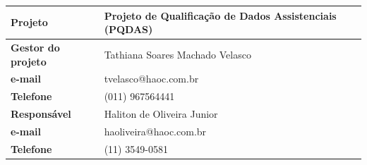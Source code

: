 \documentclass[
	12pt,				%
	openright,			%
	twoside,			%
	a4paper,			%
	english,			%
	french,				%
	spanish,			%
	brazil,				%
	]{abntex2}
\begin{document}

\frenchspacing 



\begin{historicorevisao}
\begin{table}[!h]
\centering
\begin{tabular}{|p{4cm}p{4cm}p{4cm}p{4cm}|}
\hline
\multicolumn{1}{|p{4cm}|}{\textbf{Projeto}}       & \multicolumn{3}{p{12cm}|}{Projeto de Qualificação de Dados Assistenciais (PQDAS)} \\ \hline
\multicolumn{1}{|p{4cm}|}{\textbf{Gestor do projeto}}       & \multicolumn{3}{p{12cm}|}{Tathiana Soares Machado Velasco} \\ \hline
\multicolumn{1}{|p{4cm}|}{\textbf{e-mail}}       & \multicolumn{3}{p{12cm}|}{tvelasco@haoc.com.br} \\ \hline
\multicolumn{1}{|p{4cm}|}{\textbf{Telefone}}       & \multicolumn{3}{p{12cm}|}{(011) 967564441} \\ \hline
\multicolumn{1}{|p{4cm}|}{\textbf{Responsável}}       & \multicolumn{3}{p{12cm}|}{Haliton de Oliveira Junior} \\ \hline
\multicolumn{1}{|p{4cm}|}{\textbf{e-mail}}       & \multicolumn{3}{p{12cm}|}{haoliveira@haoc.com.br} \\ \hline
\multicolumn{1}{|p{4cm}|}{\textbf{Telefone}}       & \multicolumn{3}{p{12cm}|}{(11) 3549-0581} \\ \hline
\end{tabular}
\end{table}
\end{historicorevisao}
\end{document}
